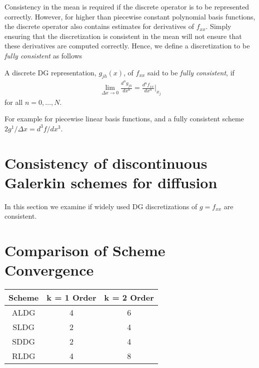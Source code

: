 \documentclass[final]{siamltex}
\begin{document}
Consistency in the mean is required if the discrete operator is to be
represented correctly. However, for higher than piecewise constant
polynomial basis functions, the discrete operator also contains
estimates for derivatives of $f_{xx}$. Simply ensuring that the
discretization is consistent in the mean will not ensure that these
derivatives are computed correctly. Hence, we define a discretization
to be \emph{fully consistent} as follows
\begin{definition}
  A discrete DG representation, $g_{jh}(x)$, of $f_{xx}$ said to be
  \emph{fully consistent}, if
  \begin{align}
    \lim_{\Delta x \rightarrow 0} \frac{d^ng_{jh}}{dx^n} =
    \frac{d^nf_{xx}}{dx^n} \biggr|_{x_j}
  \end{align}
for all $n=0,\ldots,N$.
\end{definition}

For example for piecewise linear basis functions, and a fully
consistent scheme $2g^1/\Delta x = d^3f/dx^3$. 

\section{Consistency of discontinuous Galerkin schemes for diffusion}

In this section we examine if widely used DG discretizations of
$g=f_{xx}$ are consistent.

\appendix

\section{Comparison of Scheme Convergence}
\begin{tabular}{c|c|c}
Scheme & k = 1 Order & k = 2 Order\\
\hline
ALDG & 4 & 6\\
SLDG & 2 & 4\\
SDDG & 2 & 4\\
RLDG & 4 & 8
\end{tabular}
\end{document}

